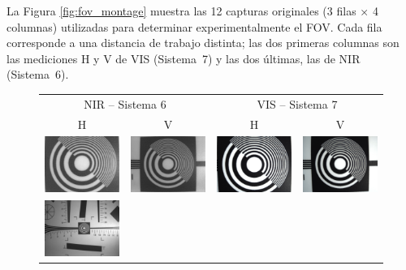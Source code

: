      La Figura \ref{fig:fov_montage} muestra las 12 capturas originales (3 filas × 4 columnas) utilizadas para determinar experimentalmente el FOV. Cada fila corresponde a una distancia de trabajo distinta; las dos primeras columnas son las mediciones H y V de VIS (Sistema 7) y las dos últimas, las de NIR (Sistema 6).
     
     \begin{figure}[H]
       \centering
       \setlength{\tabcolsep}{2pt}
       \renewcommand{\arraystretch}{0}
       \begin{tabular}{cccc}
         \multicolumn{2}{c}{\small NIR – Sistema 6} &
         \multicolumn{2}{c}{\small VIS – Sistema 7} \\
         H & V & H & V \\ 
 
         \includegraphics[width=.22\linewidth]{Figures/C4/FOV/NIR/H/7_1.png} &
         \includegraphics[width=.22\linewidth]{Figures/C4/FOV/NIR/V/8_7.png} &
         \includegraphics[width=.22\linewidth]{Figures/C4/FOV/VIS/H/9_2.png} &
         \includegraphics[width=.22\linewidth]{Figures/C4/FOV/VIS/V/10_7.png} \\
         \includegraphics[width=.22\linewidth]{Figures/C4/FOV/NIR/H/33_1.png} &

\end{tabular}
\end{figure}

